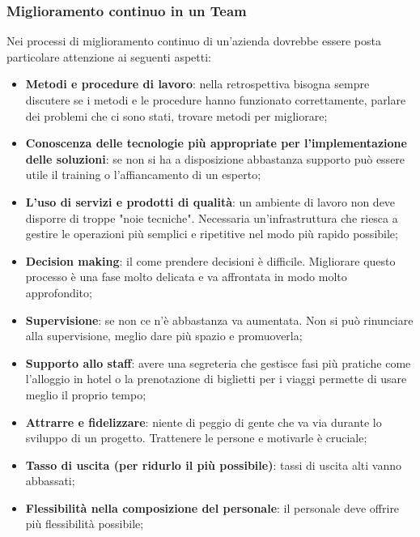 \subsubsection{Miglioramento continuo in un Team}
Nei processi di miglioramento continuo di un’azienda dovrebbe essere posta particolare attenzione ai seguenti aspetti:
\begin{itemize}
	\item \textbf{Metodi e procedure di lavoro}: nella retrospettiva bisogna sempre discutere se i metodi e le procedure hanno funzionato correttamente, parlare dei problemi che ci sono stati, trovare metodi per migliorare;
	\item \textbf{Conoscenza delle tecnologie più appropriate per l’implementazione delle soluzioni}: se non si ha a disposizione abbastanza supporto può essere utile il training o l'affiancamento di un esperto;
	\item \textbf{L’uso di servizi e prodotti di qualità}: un ambiente di lavoro non deve disporre di troppe "noie tecniche". Necessaria un'infrastruttura che riesca a gestire le operazioni più semplici e ripetitive nel modo più rapido possibile;
	\item \textbf{Decision making}: il come prendere decisioni è difficile. Migliorare questo processo è una fase molto delicata e va affrontata in modo molto approfondito;
	\item \textbf{Supervisione}: se non ce n'è abbastanza va aumentata. Non si può rinunciare alla supervisione, meglio dare più spazio e promuoverla;
	\item \textbf{Supporto allo staff}: avere una segreteria che gestisce fasi più pratiche come l'alloggio in hotel o la prenotazione di biglietti per i viaggi permette di usare meglio il proprio tempo;
	\item \textbf{Attrarre e fidelizzare}: niente di peggio di gente che va via durante lo sviluppo di un progetto. Trattenere le persone e motivarle è cruciale;
	\item \textbf{Tasso di uscita (per ridurlo il più possibile)}: tassi di uscita alti vanno abbassati;
	\item \textbf{Flessibilità nella composizione del personale}: il personale deve offrire più flessibilità possibile;
\end{itemize}

